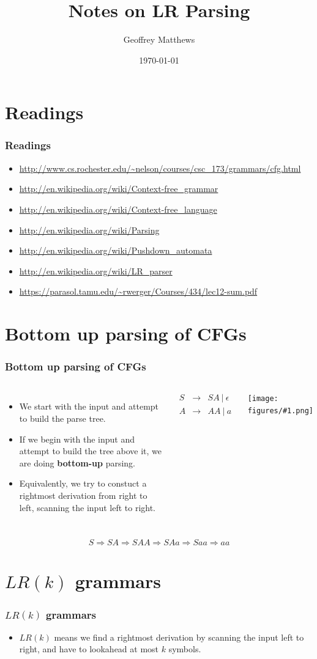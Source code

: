 \documentclass{beamer}
\title[Notes on LR Parsing]
{
 Notes on LR  Parsing
}
\subtitle{} %
\author[Geoffrey Matthews]
{Geoffrey Matthews}
\institute[WWU/CS]
{
  Department of Computer Science\\
  Western Washington University
}
\date{\today}
\newcommand{\sect}[1]{
\section{#1}
\begin{frame}[fragile]\frametitle{#1}
}
\newcommand{\myfig}[1]{\centerline{\texttt{[image: figures/\#1.png]}}}
\newcommand{\arr}{&\rightarrow&}
\newcommand{\dar}{\ensuremath{\Rightarrow}}
\newcommand{\bee}{\begin{eqnarray*}}
\newcommand{\eee}{\end{eqnarray*}}
\newcommand{\mt}{\ensuremath{\epsilon}}
\newcommand{\bi}{\begin{itemize}}
\newcommand{\li}{\item}
\newcommand{\ei}{\end{itemize}}
\begin{document}
\begin{frame}
  \titlepage
\end{frame}


\newcommand{\myref}[1]{\small\item\url{#1}}
\newcommand{\myreft}[1]{\footnotesize\item\url{#1}}


\sect{Readings}

\begin{itemize}

\myreft{http://www.cs.rochester.edu/~nelson/courses/csc_173/grammars/cfg.html}

\myreft{http://en.wikipedia.org/wiki/Context-free_grammar}

\myreft{http://en.wikipedia.org/wiki/Context-free_language}
\myreft{http://en.wikipedia.org/wiki/Parsing}

\myreft{http://en.wikipedia.org/wiki/Pushdown_automata}
\myreft{http://en.wikipedia.org/wiki/LR_parser}
\myreft{https://parasol.tamu.edu/~rwerger/Courses/434/lec12-sum.pdf}
\end{itemize}

\end{frame}

\sect{Bottom up parsing of CFGs}
\begin{columns}
\bi
\li We start with the input and attempt to build the parse tree.
\li If we begin with the input and attempt to build the tree 
above it, we are doing {\bf bottom-up} parsing.
\li Equivalently, we try to constuct a rightmost derivation from right
to left, scanning the input left to right.
\ei
{}
\bee
S \arr SA\ | \ \mt\\
A \arr AA\ | \ a
\eee
\myfig{derivationtreelr}
\end{columns}
\vfill
\[
S \dar SA \dar SAA \dar SAa \dar Saa \dar aa
\]
\end{frame}


\sect{$LR(k)$ grammars}
\bi
\li $LR(k)$ means we find a rightmost derivation by scanning the input
left to right, and have to lookahead at most $k$ symbols.
\ei
\end{frame}
\end{document}
